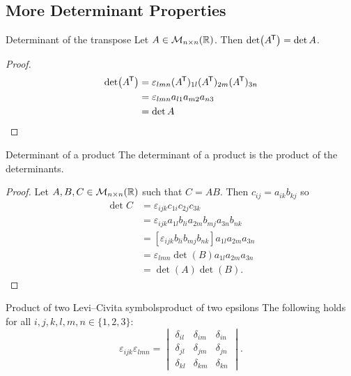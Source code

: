 \documentclass[a4paper]{article}
\newcommand{\nxmMatrices}[3]{\mathcal{M}_{{#1}\times{#2}}({#3})}
\begin{document}
    \subsection{More Determinant Properties}
    \begin{lemma}{Determinant of the transpose}{}
        Let \(A\in\nxmMatrices{n}{n}{\reals}\).
        Then \(\det(A^{\mkern-1.5mu\mathsf{T}}) = \det A\).
    \end{lemma}
    \begin{proof}
        \begin{align*}
            \det(A^{\mkern-1.5mu\mathsf{T}}) &= \varepsilon_{lmn}(A^{\mkern-1.5mu\mathsf{T}})_{1l}(A^{\mkern-1.5mu\mathsf{T}})_{2m}(A^{\mkern-1.5mu\mathsf{T}})_{3n}\\
            &= \varepsilon_{lmn}a_{l1}a_{m2}a_{n3}\\
            &= \det A
        \end{align*}
    \end{proof}
    \begin{lemma}{Determinant of a product}{}
        The determinant of a product is the product of the determinants.
    \end{lemma}
    \begin{proof}
        Let \(A, B, C\in\nxmMatrices{n}{n}{\reals}\) such that \(C = AB\).
        Then \(c_{ij} = a_{ik}b_{kj}\) so
        \begin{align*}
            \det C &= \varepsilon_{ijk}c_{1i}c_{2j}c_{3k}\\
            &= \varepsilon_{ijk}a_{1l}b_{li}a_{2m}b_{mj}a_{3n}b_{nk}\\
            &= [\varepsilon_{ijk}b_{li}b_{mj}b_{nk}]a_{1l}a_{2m}a_{3n}\\
            &= \varepsilon_{lmn}\det(B) a_{1l}a_{2m}a_{3n}\\
            &= \det(A)\det(B).
        \end{align*}
    \end{proof}
    \begin{lemma}{Product of two Levi--Civita symbols}{product of two epsilons}
        The following holds for all \(i, j, k, l, m, n\in\{1, 2, 3\}\):
        \[
            \varepsilon_{ijk}\varepsilon_{lmn} =
            \begin{vmatrix}
                \delta_{il} & \delta_{im} & \delta_{in}\\
                \delta_{jl} & \delta_{jm} & \delta_{jn}\\
                \delta_{kl} & \delta_{km} & \delta_{kn}
            \end{vmatrix}
            .
        \]
    \end{lemma}
\end{document}
